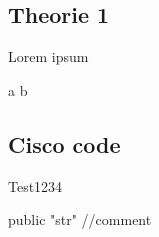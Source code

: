 \documentclass{htlstpif_protokoll}
\begin{document}
  \htlstpiftitlepage

  \tableofcontents

  \begin{theorie}
    \section{Theorie 1}

    Lorem ipsum

    a \arrow b


  \end{theorie}

  \begin{praxis}
    \section{Cisco code}

    \begin{code}
Test1234
    \end{code}

    \begin{code}[language=Java]
      public "str" //comment
    \end{code}
  \end{praxis}

\end{document}
